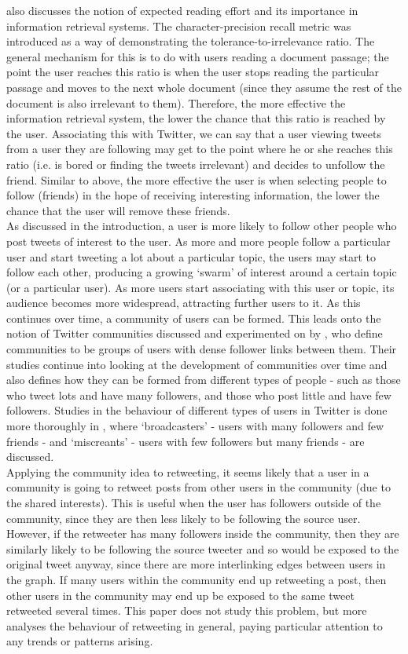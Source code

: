 \cite{arvola10} also discusses the notion of expected reading effort and its importance in information retrieval systems. The character-precision recall metric was introduced as a way of demonstrating the tolerance-to-irrelevance ratio. The general mechanism for this is to do with users reading a document passage; the point the user reaches this ratio is when the user stops reading the particular passage and moves to the next whole document (since they assume the rest of the document is also irrelevant to them). Therefore, the more effective the information retrieval system, the lower the chance that this ratio is reached by the user. Associating this with Twitter, we can say that a user viewing tweets from a user they are following may get to the point where he or she reaches this ratio (i.e. is bored or finding the tweets irrelevant) and decides to unfollow the friend. Similar to above, the more effective the user is when selecting people to follow (friends) in the hope of receiving interesting information, the lower the chance that the user will remove these friends.\\
As discussed in the introduction, a user is more likely to follow other people who post tweets of interest to the user. As more and more people follow a particular user and start tweeting a lot about a particular topic, the users may start to follow each other, producing a growing `swarm' of interest around a certain topic (or a particular user). As more users start associating with this user or topic, its audience becomes more widespread, attracting further users to it. As this continues over time, a community of users can be formed.  This leads onto the notion of Twitter communities discussed and experimented on by \cite{java07}, who define communities to be groups of users with dense follower links between them. Their studies continue into looking at the development of communities over time and also defines how they can be formed from different types of people - such as those who tweet lots and have many followers, and those who post little and have few followers. Studies in the behaviour of different types of users in Twitter is done more thoroughly in \cite{krish08}, where `broadcasters' - users with many followers and few friends - and `miscreants' - users with few followers but many friends - are discussed.\\
Applying the community idea to retweeting, it seems likely that a user in a community is going to retweet posts from other users in the community (due to the shared interests). This is useful when the user has followers outside of the community, since they are then less likely to be following the source user. However, if the retweeter has many followers inside the community, then they are similarly likely to be following the source tweeter and so would be exposed to the original tweet anyway, since there are more interlinking edges between users in the graph. If many users within the community end up retweeting a post, then other users in the community may end up be exposed to the same tweet retweeted several times. This paper does not study this problem, but more analyses the behaviour of retweeting in general, paying particular attention to any trends or patterns arising.\\


